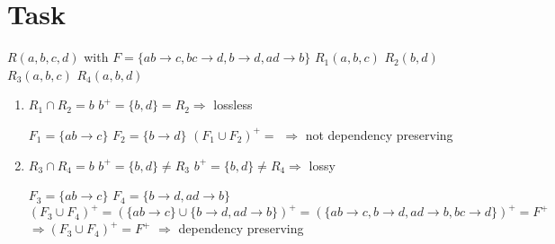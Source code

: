 \documentclass{article}
\begin{document}
\section{Task}
$R(a, b, c, d)$ with $F = \{ ab \rightarrow c, bc \rightarrow d, b \rightarrow d, ad \rightarrow b \}$\newline
$R_{1}(a, b, c)$  \newline
$R_{2}(b, d)$ \newline
$R_{3}(a, b, c)$ \newline
$R_{4}(a, b, d)$ \newline

\begin{enumerate}
    \item 
    $R_{1} \cap R_{2} = b$ \newline
    $b^{+} = \{b, d\} = R_{2} \Rightarrow $ lossless

    $F_{1} = \{ab \rightarrow c\}$ \newline
    $F_{2} = \{b \rightarrow d\}$ \newline
    $(F_{1} \cup F_{2})^{+} = $
    $\Rightarrow$ not dependency preserving
    \item 
    $R_{3} \cap R_{4} = b$ \newline
    $b^{+} = \{b, d\} \neq R_{3}$ \newline
    $b^{+} = \{b, d\} \neq R_{4} \Rightarrow $ lossy

    $F_{3} = \{ab \rightarrow c\}$ \newline
    $F_{4} = \{b \rightarrow d, ad \rightarrow b \}$ \newline
    $(F_{3} \cup F_{4})^{+} 
    = (\{ab \rightarrow c\} \cup \{b \rightarrow d, ad \rightarrow b \})^{+} 
    = (\{ab \rightarrow c, b \rightarrow d, ad \rightarrow b , bc \rightarrow d\} )^{+} 
    = F^{+}$ \newline
    $ \Rightarrow(F_{3} \cup F_{4})^{+} = F^{+}$
    $\Rightarrow$ dependency preserving
\end{enumerate}
\end{document}
